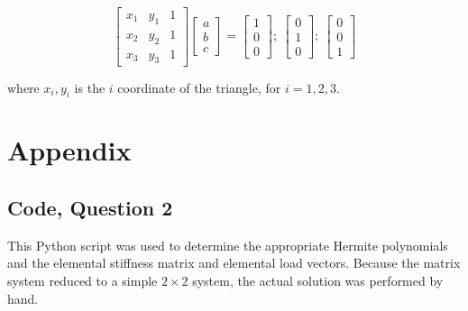\documentclass[10pt]{article}
\newcommand{\beq}{\begin{equation}}
\newcommand{\eeq}{\end{equation}}
\begin{document}
\beq
\begin{bmatrix} x_1 & y_1 & 1\\x_2 & y_2 & 1\\x_3 & y_3 & 1\end{bmatrix}
\begin{bmatrix}a\\ b\\ c\end{bmatrix}=\begin{bmatrix}1\\ 0\\ 0\end{bmatrix};\ \begin{bmatrix}0\\ 1\\ 0\end{bmatrix};\ \begin{bmatrix}0\\ 0\\ 1\end{bmatrix}
\eeq

where \(x_i, y_i\) is the \(i\) coordinate of the triangle, for \(i=1, 2, 3\).








\section{Appendix}

\subsection{Code, Question 2}

This Python script was used to determine the appropriate Hermite polynomials and the elemental stiffness matrix and elemental load vectors. Because the matrix system reduced to a simple \(2\times 2\) system, the actual solution was performed by hand.


\end{document}

